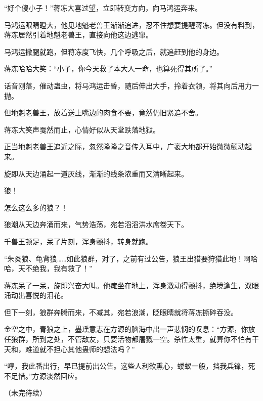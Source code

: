 \begin{this_body}
“好个傻小子！”蒋冻大喜过望，立即转变方向，向马鸿运奔来。

马鸿运眼睛瞪大，他见地魁老兽王渐渐追进，忍不住想要提醒蒋冻。但没有料到，蒋冻居然引着地魁老兽王，直接向他这边逃窜。

马鸿运撒腿就跑，但蒋冻度飞快，几个呼吸之后，就追赶到他的身边。

蒋冻哈哈大笑：“小子，你今天救了本大人一命，也算死得其所了。”

话音刚落，催动蛊虫，将马鸿运击昏，随后伸出大手，拎着衣领，将其向后用力一抛。

但地魁老兽王，放着送上嘴边的肉食不要，竟然仍旧紧追不舍。

蒋冻大笑声戛然而止，心情好似从天堂跌落地狱。

正当地魁老兽王追近之际，忽然隆隆之音传入耳中，广袤大地都开始微微颤动起来。

旋即从天边涌起一道灰线，渐渐的线条浓重而又清晰起来。

狼！

怎么这么多的狼？！

狼潮从天边奔涌而来，气势浩荡，宛若滔滔洪水席卷天下。

千兽王顿足，呆了片刻，浑身颤抖，转身就跑。

“朱炎狼、龟背狼……如此狼群，对了，之前有过公告，狼王出猎要狩猎此地！啊哈哈，天不绝我，我有救了！”

蒋冻呆了一呆，旋即兴奋大叫。他瘫坐在地上，浑身激动得颤抖，绝境逢生，双眼涌动出喜悦的泪花。

但下一刻，狼群奔腾而来，不减其，宛若浪潮，眨眼睛就将蒋冻撕碎吞没。

金空之中，青狼之上，墨瑶意志在方源的脑海中出一声悲悯的叹息：“方源，你放任狼群，所到之处，不管敌友，只要活物都屠戮一空。杀性太重，就算你不怕有干天和，难道就不担心其他蛊师的想法吗？”

“哼，我此番出行，早已提前出公告。这些人利欲熏心，蝼蚁一般，挡我兵锋，死不足惜。”方源淡然回应。

（未完待续）

\end{this_body}

